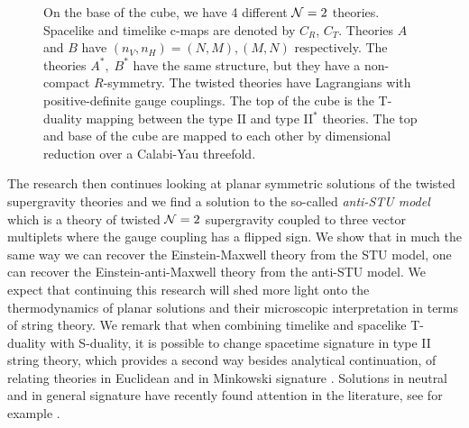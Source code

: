 \begin{figure}[!h]
	\centering
	\caption[Cube of mappings of various theories in ten and four dimensions]{On the base of the cube, we have 4 different ${\cal N} = 2$ theories. Spacelike and timelike c-maps are denoted by $C_R$, $C_T$. Theories $A$ and $B$ have $(n_V, n_H) = (N,M), (M, N)$ respectively. The theories $A^*, \; B^*$ have the same structure, but they have a non-compact $R$-symmetry. The twisted theories have Lagrangians with positive-definite gauge couplings. The top of the cube is the T-duality mapping between the type II and type II$^*$ theories. The top and base of the cube are mapped to each other by dimensional reduction over a Calabi-Yau threefold. }
	\label{fig:cube}
\end{figure}

The research then continues looking at planar symmetric solutions of the twisted supergravity theories and we find a solution to the so-called \emph{anti-STU model} which is a theory of twisted ${\cal N} = 2$ supergravity coupled to three vector multiplets where the gauge coupling has a flipped sign. We show that in much the same way we can recover the Einstein-Maxwell theory from the STU model, one can recover the Einstein-anti-Maxwell theory from the anti-STU model. We expect that continuing this research will shed more light onto the thermodynamics of planar solutions and their microscopic interpretation in terms of string theory. We remark that when combining timelike and spacelike T-duality with S-duality, it is possible to change spacetime signature in type II string theory, which provides a second way besides analytical continuation, of relating theories in Euclidean and in Minkowski signature \cite{Hull:1998ym}. Solutions in neutral and in general signature have recently found attention in the literature, see for example \cite{Klemm:2015mga, Gutowski:2019hnl, Sabra:2020gio}.

